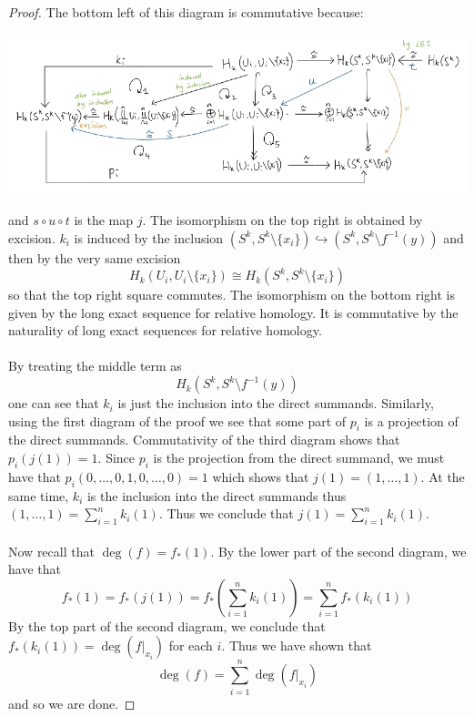 \documentclass[a4paper]{article}
\begin{document}
\begin{prp}{}{}
\begin{proof}
The bottom left of this diagram is commutative because: 

\begin{center}
\includegraphics[scale = 0.5]{Image 4}
\end{center}

and $s\circ u\circ t$ is the map $j$. The isomorphism on the top right is obtained by excision. $k_i$ is induced by the inclusion $(S^k,S^k\setminus\{x_i\})\hookrightarrow(S^k,S^k\setminus f^{-1}(y))$ and then by the very same excision $$H_k(U_i,U_i\setminus\{x_i\})\cong H_k(S^k,S^k\setminus\{x_i\})$$ so that the top right square commutes. The isomorphism on the bottom right is given by the long exact sequence for relative homology. It is commutative by the naturality of long exact sequences for relative homology. \\~\\

By treating the middle term as $$H_k(S^k,S^k\setminus f^{-1}(y))$$ one can see that $k_i$ is just the inclusion into the direct summands. Similarly, using the first diagram of the proof we see that some part of $p_i$ is a projection of the direct summands. Commutativity of the third diagram shows that $p_i(j(1))=1$. Since $p_i$ is the projection from the direct summand, we must have that $p_i(0,\dots,0,1,0,\dots,0)=1$ which shows that $j(1)=(1,\dots,1)$. At the same time, $k_i$ is the inclusion into the direct summands thus $(1,\dots,1)=\sum_{i=1}^nk_i(1)$. Thus we conclude that $j(1)=\sum_{i=1}^nk_i(1)$. \\~\\

Now recall that $\deg(f)=f_\ast(1)$. By the lower part of the second diagram, we have that $$f_\ast(1)=f_\ast(j(1))=f_\ast\left(\sum_{i=1}^nk_i(1)\right)=\sum_{i=1}^nf_\ast(k_i(1))$$ By the top part of the second diagram, we conclude that $f_\ast(k_i(1))=\deg(f|_{x_i})$ for each $i$. Thus we have shown that $$\deg(f)=\sum_{i=1}^n\deg(f|_{x_i})$$ and so we are done. 
\end{proof}
\end{prp}
\end{document}
